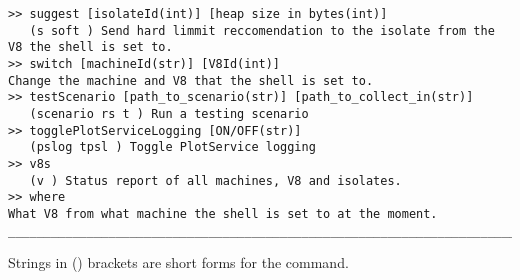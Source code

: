 \documentclass{l4proj}
\begin{document}
\begin{appendices}
\begin{lstlisting}
>> suggest [isolateId(int)] [heap size in bytes(int)]
   (s soft ) Send hard limmit reccomendation to the isolate from the V8 the shell is set to.
>> switch [machineId(str)] [V8Id(int)]
Change the machine and V8 that the shell is set to.
>> testScenario [path_to_scenario(str)] [path_to_collect_in(str)]
   (scenario rs t ) Run a testing scenario
>> togglePlotServiceLogging [ON/OFF(str)]
   (pslog tpsl ) Toggle PlotService logging
>> v8s
   (v ) Status report of all machines, V8 and isolates.
>> where
What V8 from what machine the shell is set to at the moment.
________________________________________________________________________________
\end{lstlisting}
Strings in () brackets are short forms for the command. 
\end{appendices}

\end{document}
